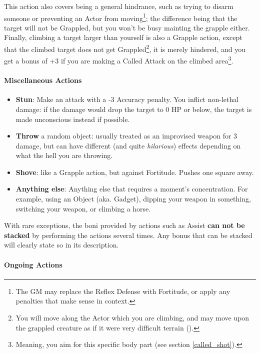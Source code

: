\begin{itemize}
    This action also covers being a general hindrance, such as trying to disarm someone or preventing an Actor from moving\footnote{The GM may replace the Reflex Defense with Fortitude, or apply any penalties that make sense in context.}; the difference being that the target will not be Grappled, but you won't be busy mainting the grapple either. \\
    Finally, climbing a target larger than yourself is also a Grapple action, except that the climbed target does not get Grappled\footnote{You will move along the Actor which you are climbing, and may move upon the grappled creature as if it were very difficult terrain ().}, it is merely hindered, and you get a bonus of +3 if you are making a Called Attack on the climbed area\footnote{Meaning, you aim for this specific body part (see section \ref{called_shot}).}.
\end{itemize}



\paragraph{Miscellaneous Actions}
\begin{itemize}
    \item \textbf{Stun}: Make an attack with a -3 Accuracy penalty. You inflict non-lethal damage: if the damage would drop the target to 0 HP or below, the target is made unconscious instead if possible. 
    \item \textbf{Throw} a random object: usually treated as an improvised weapon for 3 damage, but can have different (and quite \textit{hilarious}) effects depending on what the hell you are throwing.
    \item \textbf{Shove}: like a Grapple action, but against Fortitude. Pushes one square away.
	\item \textbf{Anything else}: Anything else that requires a moment's concentration. For example, using an Object (aka. Gadget), dipping your weapon in something, switching your weapon, or climbing a horse.
\end{itemize}

With rare exceptions, the boni provided by actions such as Assist \textbf{can not be stacked} by performing the actions several times. Any bonus that can be stacked will clearly state so in its description.

\paragraph{Ongoing Actions} 

